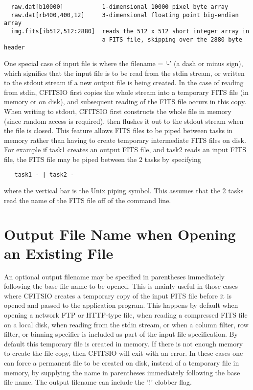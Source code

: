 \documentclass[11pt]{book}
\begin{document}
\begin{verbatim}
  raw.dat[b10000]           1-dimensional 10000 pixel byte array
  raw.dat[rb400,400,12]     3-dimensional floating point big-endian array
  img.fits[ib512,512:2880]  reads the 512 x 512 short integer array in
                            a FITS file, skipping over the 2880 byte header
\end{verbatim}

One special case of input file is where the filename = `-' (a dash or
minus sign), which signifies that the input file is to be read from the
stdin stream, or written to the stdout stream if a new output file is
being created.  In the case of reading from stdin, CFITSIO first copies
the whole stream into a temporary FITS file (in memory or on disk), and
subsequent reading of the FITS file occurs in this copy.  When writing
to stdout, CFITSIO first constructs the whole file in memory (since
random access is required), then flushes it out to the stdout stream
when the file is closed.  This feature allows FITS files to be piped
between tasks in memory rather than having to create temporary
intermediate FITS files on disk.  For example if task1 creates an
output FITS file, and task2 reads an input FITS file, the FITS file may
be piped between the 2 tasks by specifying

\begin{verbatim}
   task1 - | task2 -
\end{verbatim}
where the vertical bar is the Unix piping symbol.  This assumes that the 2
tasks read the name of the FITS file off of the command line.


\section{Output File Name when Opening an Existing File}

An optional output filename may be specified in parentheses immediately
following the base file name to be opened.  This is mainly useful in
those cases where CFITSIO creates a temporary copy of the input FITS
file before it is opened and passed to the application program.  This
happens by default when opening a network FTP or HTTP-type file, when
reading a compressed FITS file on a local disk, when reading from the
stdin stream, or when a column filter, row filter, or binning specifier
is included as part of the input file specification.  By default this
temporary file is created in memory.  If there is not enough memory to
create the file copy, then CFITSIO will exit with an error.   In these
cases one can force a permanent file to be created on disk, instead of
a temporary file in memory, by supplying the name in parentheses
immediately following the base file name.  The output filename can
include the '!' clobber flag.
\end{document}
